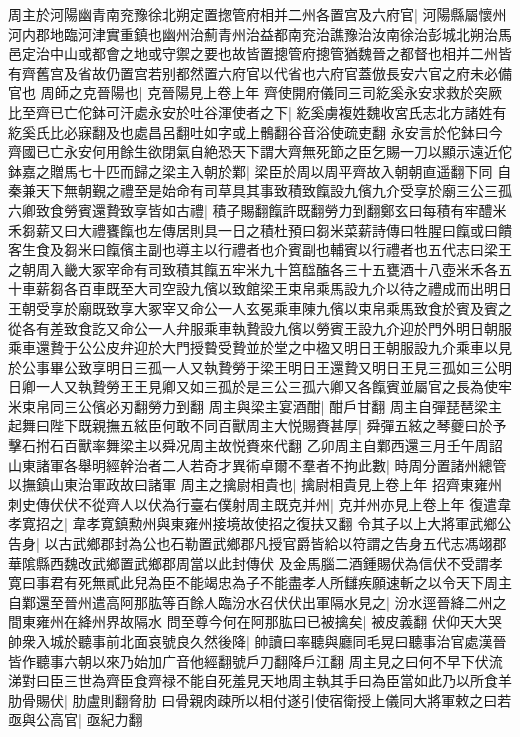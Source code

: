 周主於河陽幽青南兖豫徐北朔定置揔管府相并二州各置宫及六府官|{
	河陽縣屬懷州河内郡地臨河津實重鎮也幽州治薊青州治益都南兖治譙豫治汝南徐治彭城北朔治馬邑定治中山或都會之地或守禦之要也故皆置摠管府摠管猶魏晉之都督也相并二州皆有齊舊宫及省故仍置宫若别都然置六府官以代省也六府官蓋倣長安六官之府未必備官也}
周師之克晉陽也|{
	克晉陽見上卷上年}
齊使開府儀同三司紇奚永安求救於突厥比至齊已亡佗鉢可汗處永安於吐谷渾使者之下|{
	紇奚虜複姓魏收宮氏志北方諸姓有紇奚氏比必寐翻及也處昌呂翻吐如字或上鶻翻谷音浴使疏吏翻}
永安言於佗鉢曰今齊國已亡永安何用餘生欲閉氣自絶恐天下謂大齊無死節之臣乞賜一刀以顯示遠近佗鉢嘉之贈馬七十匹而歸之梁主入朝於鄴|{
	梁臣於周以周平齊故入朝朝直遥翻下同}
自秦兼天下無朝覲之禮至是始命有司草具其事致積致餼設九儐九介受享於廟三公三孤六卿致食勞賓還贄致享皆如古禮|{
	積子賜翻餼許既翻勞力到翻鄭玄曰每積有牢醴米禾芻薪又曰大禮饔餼也左傳居則具一日之積杜預曰芻米菜薪詩傳曰牲腥曰餼或曰饋客生食及芻米曰餼儐主副也導主以行禮者也介賓副也輔賓以行禮者也五代志曰梁王之朝周入畿大冢宰命有司致積其餼五牢米九十筥䤈醢各三十五甕酒十八壺米禾各五十車薪芻各百車既至大司空設九儐以致館梁王束帛乘馬設九介以待之禮成而出明日王朝受享於廟既致享大冢宰又命公一人玄冕乘車陳九儐以束帛乘馬致食於賓及賓之從各有差致食訖又命公一人弁服乘車執贄設九儐以勞賓王設九介迎於門外明日朝服乘車還贄于公公皮弁迎於大門授䞇受贄並於堂之中楹又明日王朝服設九介乘車以見於公事畢公致享明日三孤一人又執贄勞于梁王明日王還贄又明日王見三孤如三公明日卿一人又執贄勞王王見卿又如三孤於是三公三孤六卿又各餼賓並屬官之長為使牢米束帛同三公儐必刃翻勞力到翻}
周主與梁主宴酒酣|{
	酣戶甘翻}
周主自彈琵琶梁主起舞曰陛下既親撫五絃臣何敢不同百獸周主大悦賜賚甚厚|{
	舜彈五絃之琴夔曰於予擊石拊石百獸率舞梁主以舜况周主故悦賚來代翻}
乙卯周主自鄴西還三月壬午周詔山東諸軍各舉明經幹治者二人若奇才異術卓爾不羣者不拘此數|{
	時周分置諸州總管以撫鎮山東治軍政故曰諸軍}
周主之擒尉相貴也|{
	擒尉相貴見上卷上年}
招齊東雍州刺史傳伏伏不從齊人以伏為行臺右僕射周主既克并州|{
	克并州亦見上卷上年}
復遣韋孝寛招之|{
	韋孝寛鎮勲州與東雍州接境故使招之復扶又翻}
令其子以上大將軍武鄉公告身|{
	以古武鄉郡封為公也石勒置武鄉郡凡授官爵皆給以符謂之告身五代志馮翊郡華隂縣西魏改武鄉置武鄉郡周當以此封傳伏}
及金馬腦二酒鍾賜伏為信伏不受謂孝寛曰事君有死無貳此兒為臣不能竭忠為子不能盡孝人所讎疾願速斬之以令天下周主自鄴還至晉州遣高阿那肱等百餘人臨汾水召伏伏出軍隔水見之|{
	汾水逕晉絳二州之間東雍州在絳州界故隔水}
問至尊今何在阿那肱曰已被擒矣|{
	被皮義翻}
伏仰天大哭帥衆入城於聽事前北面哀號良久然後降|{
	帥讀曰率聽與廳同毛晃曰聽事治官處漢晉皆作聽事六朝以來乃始加广音他經翻號戶刀翻降戶江翻}
周主見之曰何不早下伏流涕對曰臣三世為齊臣食齊禄不能自死羞見天地周主執其手曰為臣當如此乃以所食羊肋骨賜伏|{
	肋盧則翻脅肋}
曰骨親肉疎所以相付遂引使宿衛授上儀同大將軍敕之曰若亟與公高官|{
	亟紀力翻}
